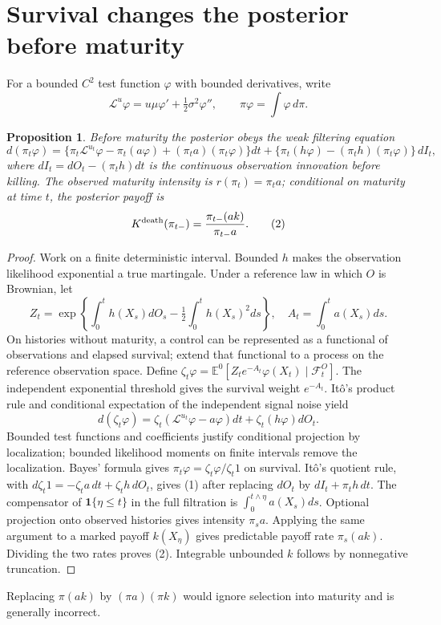 \documentclass[11pt]{article}
\newtheorem{proposition}[theorem]{Proposition}
\theoremstyle{definition}
\begin{document}
\section*{Survival changes the posterior before maturity}
For a bounded $C^2$ test function $\varphi$ with bounded derivatives, write
\[
 \mathcal L^u\varphi=u\mu\varphi'+\tfrac12\sigma^2\varphi'',\qquad
 \pi\varphi=\int\varphi\,d\pi.
\]
\begin{proposition}
Before maturity the posterior obeys the weak filtering equation
\[
 d(\pi_t\varphi)=\{\pi_t\mathcal L^{u_t}\varphi
            -\pi_t(a\varphi)+(\pi_ta)(\pi_t\varphi)\}dt
  +\{\pi_t(h\varphi)-(\pi_th)(\pi_t\varphi)\}\,dI_t,       \tag{1}
\]
where $dI_t=dO_t-(\pi_th)dt$ is the continuous observation innovation
before killing. The observed maturity intensity is $r(\pi_t)=\pi_ta$;
conditional on maturity at time $t$, the posterior payoff is
\[
 K^{\rm death}(\pi_{t-})=\frac{\pi_{t-}(ak)}{\pi_{t-}a}.  \tag{2}
\]
\end{proposition}
\begin{proof}
Work on a finite deterministic interval. Bounded $h$ makes the observation
likelihood exponential a true martingale. Under a reference law in which
$O$ is Brownian, let
\[
 Z_t=\exp\left\{\int_0^t h(X_s)dO_s-\tfrac12\int_0^th(X_s)^2ds\right\},
 \quad A_t=\int_0^ta(X_s)ds.
\]
On histories without maturity, a control can be represented as a functional
of observations and elapsed survival; extend that functional to a process
on the reference observation space. Define
$\zeta_t\varphi=\mathbb E^{0}[Z_te^{-A_t}\varphi(X_t)\mid\mathcal F_t^O]$.
The independent exponential threshold gives the survival weight $e^{-A_t}$.
It\^o's product rule and conditional expectation of the independent signal
noise yield
\[
 d(\zeta_t\varphi)=\zeta_t(\mathcal L^{u_t}\varphi-a\varphi)dt
                            +\zeta_t(h\varphi)dO_t.
\]
Bounded test functions and coefficients justify conditional projection by
localization; bounded likelihood moments on finite intervals remove the
localization. Bayes' formula gives $\pi_t\varphi=\zeta_t\varphi/\zeta_t1$
on survival. It\^o's quotient rule, with
$d\zeta_t1=-\zeta_ta\,dt+\zeta_th\,dO_t$, gives (1) after replacing
$dO_t$ by $dI_t+\pi_th\,dt$.
The compensator of $\mathbf1\{\eta\le t\}$ in the full filtration is
$\int_0^{t\wedge\eta}a(X_s)ds$. Optional projection onto observed
histories gives intensity $\pi_sa$. Applying the same argument to a
marked payoff $k(X_\eta)$ gives predictable payoff rate $\pi_s(ak)$.
Dividing the two rates proves (2). Integrable unbounded $k$ follows by
nonnegative truncation.
\end{proof}
Replacing $\pi(ak)$ by $(\pi a)(\pi k)$ would ignore selection into
maturity and is generally incorrect.
\end{document}
